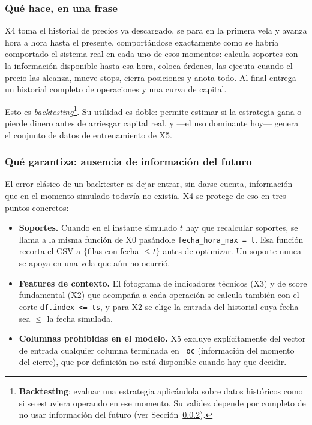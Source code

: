 \documentclass[11pt,a4paper]{article}
\newcommand{\code}[1]{\texttt{\small #1}}
\newcommand{\bigsep}{\par\vspace{3pt}}
\begin{document}
\subsubsection{Qué hace, en una frase}

X4 toma el historial de precios ya descargado, se para en la primera vela y avanza hora a
hora hasta el presente, comportándose exactamente como se habría comportado el sistema
real en cada uno de esos momentos: calcula soportes con la información disponible hasta
esa hora, coloca órdenes, las ejecuta cuando el precio las alcanza, mueve stops, cierra
posiciones y anota todo. Al final entrega un historial completo de operaciones y una curva
de capital.

\bigsep
Esto es \textit{backtesting}\footnote{\textbf{Backtesting}: evaluar una estrategia
aplicándola sobre datos históricos como si se estuviera operando en ese momento. Su
validez depende por completo de no usar información del futuro (ver
Sección~\ref{sec:x4-nolookahead}).}. Su utilidad es doble: permite estimar si la estrategia
gana o pierde dinero antes de arriesgar capital real, y —el uso dominante hoy— genera el
conjunto de datos de entrenamiento de X5.

\subsubsection{Qué garantiza: ausencia de información del futuro}
\label{sec:x4-nolookahead}

El error clásico de un backtester es dejar entrar, sin darse cuenta, información que en el
momento simulado todavía no existía. X4 se protege de eso en tres puntos concretos:

\begin{itemize}[leftmargin=1.4em,itemsep=2pt]
\item \textbf{Soportes.} Cuando en el instante simulado $t$ hay que recalcular soportes, se
llama a la misma función de X0 pasándole \code{fecha_hora_max = t}. Esa función recorta el
CSV a $\{$filas con fecha $\le t\}$ antes de optimizar. Un soporte nunca se apoya en una
vela que aún no ocurrió.
\item \textbf{Features de contexto.} El fotograma de indicadores técnicos (X3) y de score
fundamental (X2) que acompaña a cada operación se calcula también con el corte
\code{df.index <= ts}, y para X2 se elige la entrada del historial cuya fecha sea $\le$ la
fecha simulada.
\item \textbf{Columnas prohibidas en el modelo.} X5 excluye explícitamente del vector de
entrada cualquier columna terminada en \code{_oc} (información del momento del cierre), que
por definición no está disponible cuando hay que decidir.
\end{itemize}
\end{document}
